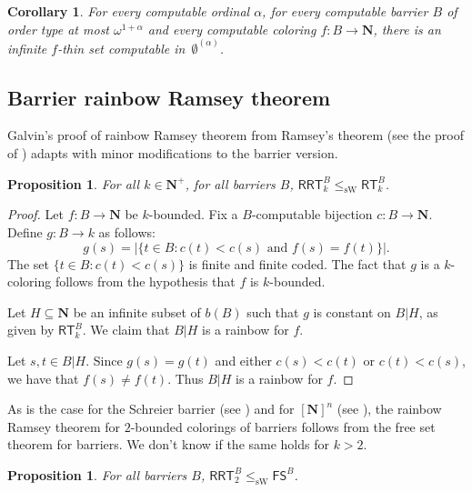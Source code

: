 \documentclass{amsart}
\theoremstyle{plain}
\theoremstyle{plain}
\newtheorem{corollary}[theorem]{Corollary}
\newtheorem{proposition}[theorem]{Proposition}
\newcommand{\om}{\omega}
\newcommand{\al}{{\alpha}}
\newcommand\Nat{\mathbf{N}}
\newcommand\RT{\mathsf{RT}}
\newcommand\FreeS{\mathsf{FS}}
\newcommand\RRT{\mathsf{RRT}}
\newcommand\sW{\mathrm{sW}}
\begin{document}
\begin{corollary}
For every computable ordinal $\alpha$, for every computable barrier $B$ of order type at most $\om^{1+\al}$ and every computable coloring $f : B \to \Nat$, there is an infinite $f$-thin set computable in~$\emptyset^{(\al)}$.
\end{corollary}

\subsection{Barrier rainbow Ramsey theorem}\label{sub:rain}

Galvin's proof of rainbow Ramsey theorem from Ramsey's theorem (see the proof of \cite[Theorem 1.6]{CsimaMileti_2009}) adapts with minor modifications to the barrier version.

\begin{proposition}
For all $k\in\Nat^+$, for all barriers $B$, $\RRT^B_k \leq_{\sW} \RT^B_k$.
\end{proposition}

\begin{proof}
Let $f:B \to \Nat$ be $k$-bounded. Fix a $B$-computable bijection $c : B \to \Nat$. 
Define $g:B \to k$ as follows:
$$ g(s) = |\{ t \in B : c(t) < c(s) \text{ and } f(s) = f(t)\}|.$$
The set $\{ t \in B : c(t) < c(s)\}$ is finite and finite coded.
The fact that $g$ is a $k$-coloring follows from the hypothesis that $f$ is $k$-bounded.

Let $H\subseteq\Nat$ be an infinite subset of $b(B)$ such that $g$ is constant on $B\vert H$, as given by $\RT^B_k$. We claim that $B\vert H$ is a rainbow for $f$.

Let $s, t \in B\vert H$. Since $g(s) = g(t)$ and either $c(s) < c(t)$ or $c(t) < c(s)$, we have that $f(s) \neq f(t)$. Thus $B\vert H$ is a rainbow for $f$. 
 \end{proof}

As is the case for the Schreier barrier (see \cite[Proposition 3.11]{carlucci2024ramseyliketheoremsschreierbarrier}) and for $[\Nat]^n$ (see \cite[Theorem 4.2]{wang2014some}), the rainbow Ramsey theorem for $2$-bounded colorings of barriers follows from the free set theorem for
barriers. We don't know if the same holds for $k>2$.

\begin{proposition}
For all barriers $B$, $\RRT^{B}_2 \leq_{\sW} \FreeS^{B} $.
\end{proposition}
\end{document}
